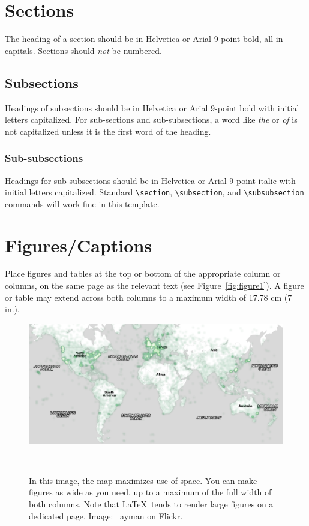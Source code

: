 \documentclass{sigchi}
\begin{document}
\section{Sections}

The heading of a section should be in Helvetica or Arial 9-point bold,
all in capitals. Sections should \textit{not} be numbered.

\subsection{Subsections}

Headings of subsections should be in Helvetica or Arial 9-point bold
with initial letters capitalized.  For sub-sections and
sub-subsections, a word like \emph{the} or \emph{of} is not
capitalized unless it is the first word of the heading.

\subsubsection{Sub-subsections}

Headings for sub-subsections should be in Helvetica or Arial 9-point
italic with initial letters capitalized.  Standard
\texttt{{\textbackslash}section}, \texttt{{\textbackslash}subsection},
and \texttt{{\textbackslash}subsubsection} commands will work fine in
this template.

\section{Figures/Captions}

Place figures and tables at the top or bottom of the appropriate
column or columns, on the same page as the relevant text (see
Figure~\ref{fig:figure1}). A figure or table may extend across both
columns to a maximum width of 17.78 cm (7 in.).

\begin{figure}
  \centering
  \includegraphics[width=1.75\columnwidth]{figures/map}
  \caption{In this image, the map maximizes use of space. You can make
    figures as wide as you need, up to a maximum of the full width of
    both columns. Note that \LaTeX\ tends to render large figures on a
    dedicated page. Image: \ccbynd~ayman on
    Flickr.}~\label{fig:figure2}
\end{figure}
\end{document}
